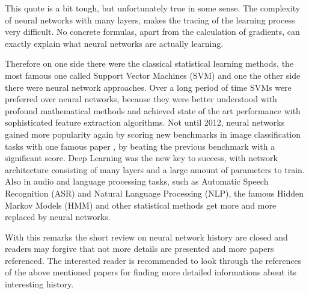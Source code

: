 This quote is a bit tough, but unfortunately true in some sense. 
The complexity of neural networks with many layers, makes the tracing of the learning process very difficult.
No concrete formulas, apart from the calculation of gradients, can exactly explain what neural networks are actually learning.

Therefore on one side there were the classical statistical learning methods, the most famous one called Support Vector Machines (SVM) \cite{Cortes1995} and one the other side there were neural network approaches.
Over a long period of time SVMs were preferred over neural networks, because they were better understood with profound mathematical methods and achieved state of the art performance with sophisticated feature extraction algorithms.
Not until 2012, neural networks gained more popularity again by scoring new benchmarks in image classification tasks with one famous paper \cite{Krizhevsky2012}, by beating the previous benchmark with a significant score.
Deep Learning was the new key to success, with network architecture consisting of many layers and a large amount of parameters to train.
Also in audio and language processing tasks, such as Automatic Speech Recognition (ASR) and Natural Language Processing (NLP), the famous Hidden Markov Models (HMM) and other statistical methods get more and more replaced by neural networks.

With this remarks the short review on neural network history are closed and readers may forgive that not more details are presented and more papers referenced.
The interested reader is recommended to look through the references of the above mentioned papers for finding more detailed informations about its interesting history.
